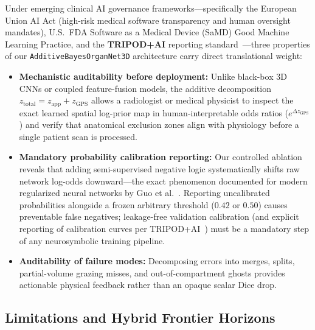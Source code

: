 \documentclass[10pt,a4paper]{article}
\renewcommand{\_}{\origunderscore\allowbreak}
\begin{document}
Under emerging clinical AI governance frameworks---specifically the European Union AI Act (high-risk medical software transparency and human oversight mandates), U.S.\ FDA Software as a Medical Device (SaMD) Good Machine Learning Practice, and the \textbf{TRIPOD+AI} reporting standard~\cite{collins2024tripodai}---three properties of our \texttt{AdditiveBayesOrganNet3D} architecture carry direct translational weight:
\begin{itemize}
    \item \textbf{Mechanistic auditability before deployment:} Unlike black-box 3D CNNs or coupled feature-fusion models, the additive decomposition $z_{\text{total}} = z_{\text{app}} + z_{\text{GPS}}$ allows a radiologist or medical physicist to inspect the exact learned spatial log-prior map in human-interpretable odds ratios ($e^{\Delta z_{\text{GPS}}}$) and verify that anatomical exclusion zones align with physiology before a single patient scan is processed.
    \item \textbf{Mandatory probability calibration reporting:} Our controlled ablation reveals that adding semi-supervised negative logic systematically shifts raw network log-odds downward---the exact phenomenon documented for modern regularized neural networks by Guo et al.~\cite{guo2017calibration}. Reporting uncalibrated probabilities alongside a frozen arbitrary threshold ($0.42$ or $0.50$) causes preventable false negatives; leakage-free validation calibration (and explicit reporting of calibration curves per TRIPOD+AI~\cite{collins2024tripodai}) must be a mandatory step of any neurosymbolic training pipeline.
    \item \textbf{Auditability of failure modes:} Decomposing errors into merges, splits, partial-volume grazing misses, and out-of-compartment ghosts provides actionable physical feedback rather than an opaque scalar Dice drop.
\end{itemize}

\subsection{Limitations and Hybrid Frontier Horizons}
\label{sec:disc_limits}
\end{document}
